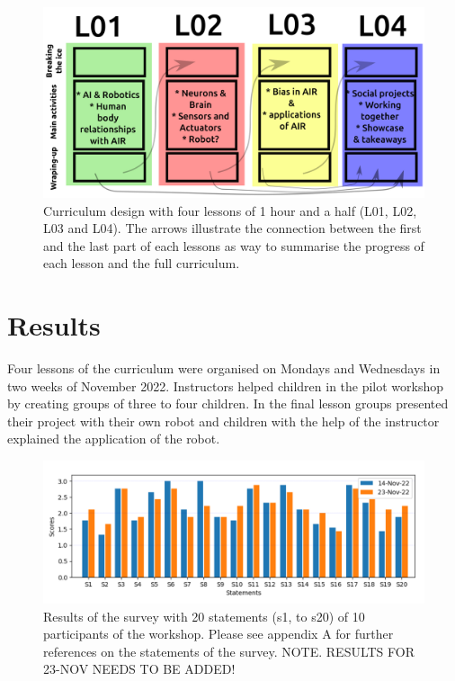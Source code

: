 \documentclass[sigconf,anonymous,review]{acmart}
\begin{document}
\begin{figure}[h]
  \centering
    \includegraphics[width=\linewidth]{../figures/curriculum/outputs/drawing-v01.png}  %
    \caption{
    Curriculum design with four lessons of 1 hour and a half 
 (L01, L02, L03 and L04).
    The arrows illustrate the connection between the first and the last part of each lessons as way to summarise the progress of each lesson and the full curriculum.
    }
    \label{fig:curriculum}
\end{figure}

\section{Results}
Four lessons of the curriculum were organised on Mondays and Wednesdays in two weeks of November 2022. 
Instructors helped children in the pilot workshop by creating groups of three to four children.
In the final lesson groups presented their project with their own robot and children with the help of the instructor explained the application of the robot.


\begin{figure}[h]
  \centering
    \includegraphics[width=\linewidth]{../figures/results/outputs/drawing-v00.png}  %
    \caption{
    Results of the survey with 20 statements (s1, to s20) of 10 participants of the workshop. Please see appendix A for further references on the statements of the survey.
    NOTE. RESULTS FOR 23-NOV NEEDS TO BE ADDED!
    }
    \label{fig:results}
\end{figure}
\end{document}
